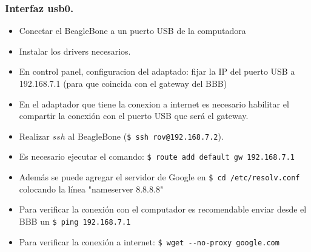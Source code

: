 \subsubsection{Interfaz usb0.}
    \begin{itemize}
        \item Conectar el BeagleBone a un puerto USB de la computadora
        \item Instalar los drivers necesarios.
        \item En control panel, configuracion del adaptado: fijar la IP del puerto USB a 192.168.7.1 (para que coincida con el gateway del BBB)
        \item En el adaptador que tiene la conexion a internet es necesario habilitar el compartir la conexión con el puerto USB que será el gateway.
        \item Realizar $ssh$ al BeagleBone (\verb|$ ssh rov@192.168.7.2|). 
        \item Es necesario ejecutar el comando: \verb|$ route add default gw 192.168.7.1|
        \item Además se puede agregar el servidor de Google en \verb|$ cd /etc/resolv.conf| colocando la línea "nameserver 8.8.8.8"
        \item Para verificar la conexión con el computador es recomendable enviar desde el BBB un \verb|$ ping 192.168.7.1|
        \item Para verificar la conexión a internet: \verb|$ wget --no-proxy google.com|
    \end{itemize}
    
